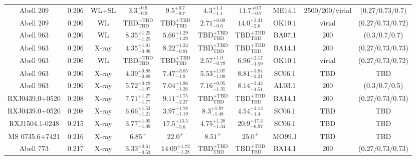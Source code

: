 \begin{table}
\begin{tabular}{cccccccccc}
Abell 209 & 0.206 & WL+SL & ${3.3}^{+0.9}_{-0.9}$ & ${9.5}^{+0.7}_{-0.7}$ & ${4.3}^{+1.1}_{-1.1}$ & ${11.7}^{+0.7}_{-0.7}$ & ME14.1 & 2500/200/virial & (0.27/0.73/0.7) \\
Abell 209 & 0.206 & WL & ${\mathrm{TBD}}^{+\mathrm{TBD}}_{\mathrm{TBD}}$ & ${\mathrm{TBD}}^{+\mathrm{TBD}}_{\mathrm{TBD}}$ & ${2.71}^{+0.69}_{-0.6}$ & ${14.0}^{+3.31}_{-2.6}$ & OK10.1 & virial & (0.27/0.73/0.72) \\
Abell 963 & 0.206 & WL & ${8.35}^{+1.25}_{-1.25}$ & ${5.66}^{+1.29}_{-1.29}$ & ${\mathrm{TBD}}^{+\mathrm{TBD}}_{\mathrm{TBD}}$ & ${\mathrm{TBD}}^{+\mathrm{TBD}}_{\mathrm{TBD}}$ & BA07.1 & 200 & (0.3/0.7/0.7) \\
Abell 963 & 0.206 & X-ray & ${4.35}^{+1.01}_{-0.99}$ & ${8.22}^{+1.24}_{-0.91}$ & ${\mathrm{TBD}}^{+\mathrm{TBD}}_{\mathrm{TBD}}$ & ${\mathrm{TBD}}^{+\mathrm{TBD}}_{\mathrm{TBD}}$ & BA14.1 & 200 & (0.27/0.73/0.73) \\
Abell 963 & 0.206 & WL & ${\mathrm{TBD}}^{+\mathrm{TBD}}_{\mathrm{TBD}}$ & ${\mathrm{TBD}}^{+\mathrm{TBD}}_{\mathrm{TBD}}$ & ${2.57}^{+1.0}_{-0.79}$ & ${6.96}^{+2.17}_{-1.59}$ & OK10.1 & virial & (0.27/0.73/0.72) \\
Abell 963 & 0.206 & X-ray & ${4.39}^{+0.88}_{-0.88}$ & ${7.47}^{+3.05}_{-1.8}$ & ${5.53}^{+1.07}_{-1.08}$ & ${8.81}^{+3.84}_{-2.21}$ & SC06.1 & TBD & TBD \\
Abell 963 & 0.206 & X-ray & ${5.72}^{+0.78}_{-1.07}$ & ${7.04}^{+1.96}_{-1.26}$ & ${7.16}^{+0.95}_{-1.31}$ & ${8.14}^{+2.43}_{-1.51}$ & AL03.1 & 200 & (0.3/0.7/0.5) \\
RXJ0439.0+0520 & 0.208 & X-ray & ${7.71}^{+1.27}_{-1.77}$ & ${9.11}^{+1.75}_{-2.27}$ & ${\mathrm{TBD}}^{+\mathrm{TBD}}_{\mathrm{TBD}}$ & ${\mathrm{TBD}}^{+\mathrm{TBD}}_{\mathrm{TBD}}$ & BA14.1 & 200 & (0.27/0.73/0.73) \\
RXJ0439.0+0520 & 0.208 & X-ray & ${6.66}^{+1.53}_{-1.21}$ & ${3.97}^{+1.78}_{-1.19}$ & ${8.3}^{+1.87}_{-1.48}$ & ${4.54}^{+2.13}_{-1.4}$ & SC06.1 & TBD & TBD \\
RXJ1504.1-0248 & 0.215 & X-ray & ${3.77}^{+1.05}_{-1.09}$ & ${17.5}^{+13.5}_{-5.6}$ & ${4.75}^{+1.28}_{-1.34}$ & ${20.9}^{+17.3}_{-6.97}$ & SC06.1 & TBD & TBD \\
MS 0735.6+7421 & 0.216 & X-ray & ${6.85}^{+}_{}$ & ${22.0}^{+}_{}$ & ${8.51}^{+}_{}$ & ${25.0}^{+}_{}$ & MO99.1 & TBD & TBD \\
Abell 773 & 0.217 & X-ray & ${3.33}^{+0.61}_{-0.53}$ & ${14.09}^{+1.72}_{-1.28}$ & ${\mathrm{TBD}}^{+\mathrm{TBD}}_{\mathrm{TBD}}$ & ${\mathrm{TBD}}^{+\mathrm{TBD}}_{\mathrm{TBD}}$ & BA14.1 & 200 & (0.27/0.73/0.73) \\

\end{tabular}
\end{table}
